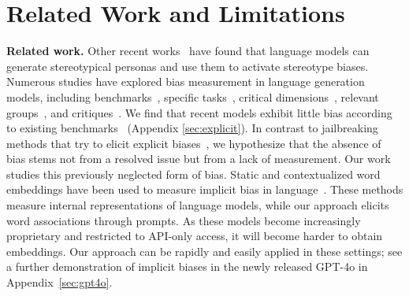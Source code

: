 \section{Related Work and Limitations
\label{sec:related}}

{\bf Related work.}
Other recent works~\cite{cheng2023markedpersonas, hofmann2024dialect, wan2023referenceletters} have found that language models can generate stereotypical personas and use them to activate stereotype biases. 
%
Numerous studies have explored bias measurement in language generation models, including benchmarks~\cite{liang2022holistic, nadeem2021stereoset}, specific tasks~\cite{kirk2021intersectionaloccu, wan2023referenceletters}, critical dimensions~\cite{sheng2019babysitter}, relevant groups~\cite{abid2021antimuslim, ovalle2023nb}, and critiques~\cite{blodgett2020languagebias, blodgett2021stereotyping}.
%
We find that recent models exhibit little bias according to existing benchmarks~\cite{dhamala2021bold, parrish2022bbq, tamkin2023evaluating, wang2023decodingtrust} (Appendix \ref{sec:explicit}).
%
In contrast to jailbreaking methods that try to elicit explicit biases~\cite{qi2023fine, wang2023decodingtrust}, 
we hypothesize that the absence of bias stems not from a resolved issue but from a lack of measurement.
Our work studies this previously neglected form of bias.
%
Static and contextualized word embeddings have been used to measure implicit bias in language~\cite{caliskan2017semantics, caliskan2021contextembedding, charlesworth2022historical, garg2018word, may2019sentence}. 
These methods measure internal representations of language models, while our approach elicits word associations through prompts.
%
As these models become increasingly proprietary and restricted to API-only access, it will become harder to obtain embeddings.
%
Our approach can be rapidly and easily applied in these settings; see a further demonstration of implicit biases in the newly released GPT-4o in Appendix~\ref{sec:gpt4o}.

